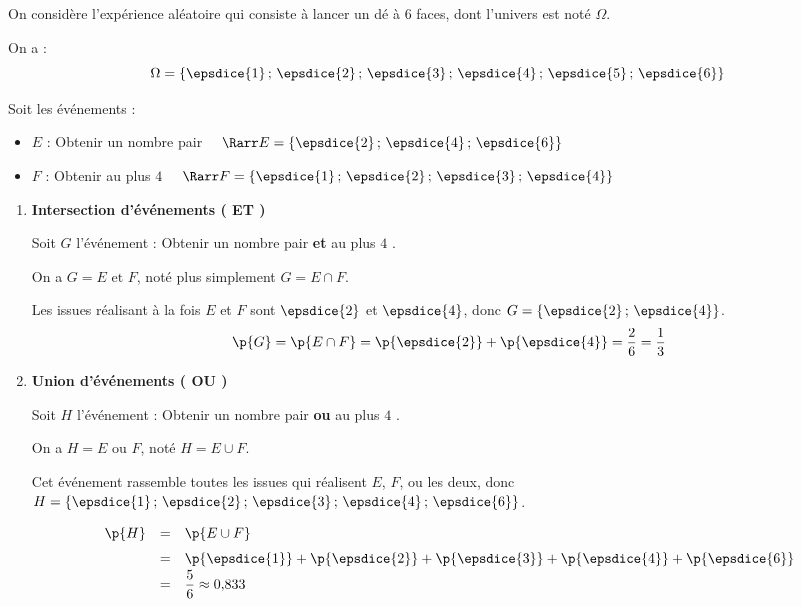 \begin{ex}
	On considère l'expérience aléatoire qui consiste à lancer un dé à 6 faces, dont l'univers est noté $\Omega$.

	On a :
	\[
		\Omega = \left\{\epsdice{1}\,;\,\epsdice{2}\,;\,\epsdice{3}\,;\,\epsdice{4}\,;\,\epsdice{5}\,;\,\epsdice{6}\right\}
	\]

	Soit les événements :

	\begin{itemize}
		\item $E$ : \og{} Obtenir un nombre pair \fg{} $\quad\Rarr E = \left\{\epsdice{2}\,;\,\epsdice{4}\,;\,\epsdice{6}\right\}$
		\item $F$ : \og{} Obtenir au plus $4$ \fg{} $\quad\Rarr F = \left\{\epsdice{1}\,;\,\epsdice{2}\,;\,\epsdice{3}\,;\,\epsdice{4}\right\}$
	\end{itemize}

	\begin{enumerate}
		\item \textbf{Intersection d'événements (\og{} ET \fg{})}

		      Soit $G$ l'événement : \og{} Obtenir un nombre pair \textbf{et} au plus $4$ \fg{}.

		      On a $G = E \text{ et } F$, noté plus simplement $G = E \cap F$.

		      Les issues réalisant à la fois $E$ et $F$ sont $\epsdice{2}$ et $\epsdice{4}$, donc $G = \left\{\epsdice{2}\,;\,\epsdice{4}\right\}$.
		      \[
			      \p{G} = \p{E \cap F} = \p{\epsdice{2}} + \p{\epsdice{4}} = \dfrac{2}{6} = \dfrac{1}{3}
		      \]

		\item \textbf{Union d'événements (\og{} OU \fg{})}

		      Soit $H$ l'événement : \og{} Obtenir un nombre pair \textbf{ou} au plus $4$ \fg{}.

		      On a $H = E \text{ ou } F$, noté $H = E \cup F$.

		      Cet événement rassemble toutes les issues qui réalisent $E$, $F$, ou les deux, donc $H = \left\{\epsdice{1}\,;\,\epsdice{2}\,;\,\epsdice{3}\,;\,\epsdice{4}\,;\,\epsdice{6}\right\}$.
		      \[
			      \def\arraystretch{1.5}
			      \begin{array}{rcl}
				      \p{H} & = & \p{E \cup F}                                                                            \\
				            & = & \p{\epsdice{1}} + \p{\epsdice{2}} + \p{\epsdice{3}} + \p{\epsdice{4}} + \p{\epsdice{6}} \\
				            & = & \dfrac{5}{6} \approx 0{,}833
			      \end{array}
		      \]
	\end{enumerate}
\end{ex}

